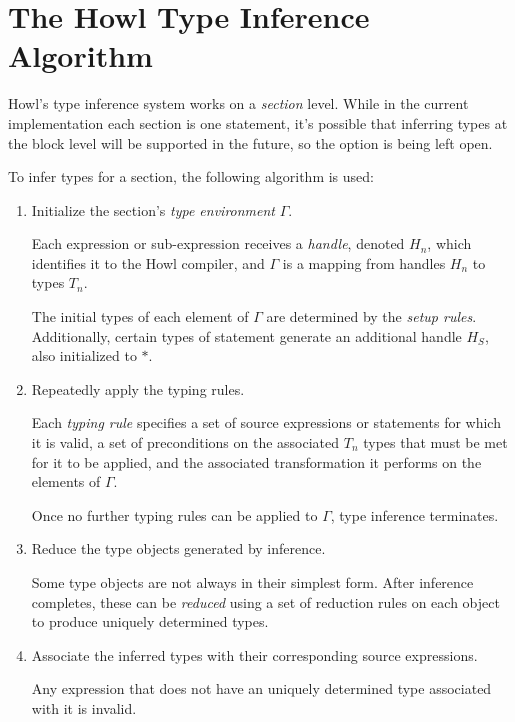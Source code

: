 \documentclass{article}
\begin{document}
\section{The Howl Type Inference Algorithm}

Howl's type inference system works on a \textit{section} level.
While in the current implementation each section is one statement, it's possible that inferring types at the block level will be supported in the future, so the option is being left open.

To infer types for a section, the following algorithm is used:

\begin{enumerate}
    \item Initialize the section's \textit{type environment} $\Gamma$.

          Each expression or sub-expression receives a \textit{handle}, denoted $H_n$, which identifies it to the Howl compiler, and $\Gamma$ is a mapping from handles $H_n$ to types $T_n$.

          The initial types of each element of $\Gamma$ are determined by the \textit{setup rules}.
          Additionally, certain types of statement generate an additional handle $H_S$, also initialized to $\ast$.

    \item Repeatedly apply the typing rules.

          Each \textit{typing rule} specifies a set of source expressions or statements for which it is valid, a set of preconditions on the associated $T_n$ types that must be met for it to be applied, and the associated transformation it performs on the elements of $\Gamma$.

          Once no further typing rules can be applied to $\Gamma$, type inference terminates.

    \item Reduce the type objects generated by inference.

          Some type objects are not always in their simplest form.
          After inference completes, these can be \textit{reduced} using a set of reduction rules on each object to produce uniquely determined types.

    \item Associate the inferred types with their corresponding source expressions.

          Any expression that does not have an uniquely determined type associated with it is invalid.

\end{enumerate}
\end{document}
